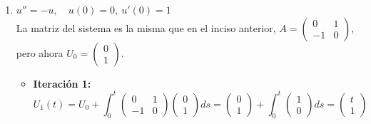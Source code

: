 {\begin{enumerate} [label=\alph*)]
\begin{itemize}
                \item \textbf{Iteración 3:}
                $$U_3(t) = U_0 + \int_0^t \begin{pmatrix} 0 & 1 \\ -1 & 0 \end{pmatrix} \begin{pmatrix} 1 - \frac{s^2}{2!} \\ -s \end{pmatrix} ds = \begin{pmatrix} 1 \\ 0 \end{pmatrix} + \int_0^t \begin{pmatrix} -s \\ -1 + \frac{s^2}{2!} \end{pmatrix} ds = \begin{pmatrix} 1 - \frac{t^2}{2!} \\ -t + \frac{t^3}{3!} \end{pmatrix}$$
                \item \textbf{Convergencia:} La primera componente $u(t)$ acumula únicamente potencias pares con signos alternos:
                $$u_n(t) = \sum_{k=0}^{\lfloor n/2 \rfloor} \frac{(-1)^k t^{2k}}{(2k)!}$$
                Este límite corresponde exactamente a la serie de Taylor del coseno:
                $$u(t) = \cos(t)$$
            \end{itemize}
        \item $u'' = -u, \quad u(0) = 0, \ u'(0) = 1$ \\
            La matriz del sistema es la misma que en el inciso anterior, $A = \begin{pmatrix} 0 & 1 \\ -1 & 0 \end{pmatrix}$, pero ahora $U_0 = \begin{pmatrix} 0 \\ 1 \end{pmatrix}$.
            \begin{itemize}
                \item \textbf{Iteración 1:}
                $$U_1(t) = U_0 + \int_0^t \begin{pmatrix} 0 & 1 \\ -1 & 0 \end{pmatrix} \begin{pmatrix} 0 \\ 1 \end{pmatrix} ds = \begin{pmatrix} 0 \\ 1 \end{pmatrix} + \int_0^t \begin{pmatrix} 1 \\ 0 \end{pmatrix} ds = \begin{pmatrix} t \\ 1 \end{pmatrix}$$

\end{itemize}
\end{enumerate}}
